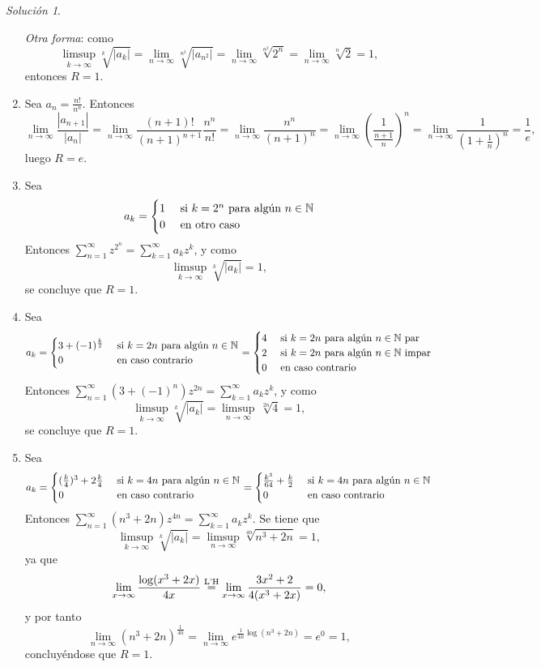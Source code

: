\documentclass[11pt]{report}
\newcommand{\N}{\mathbb N}
\newcommand{\serie}[2][0]{\sum_{n=#1}^\infty #2}
\theoremstyle{remark}
\newtheorem*{resolution}{Solución}
\begin{document}
\begin{resolution}
\begin{enumerate}
    \textit{Otra forma}: como
    \[\limsup_{k \to \infty} \sqrt[k]{|a_k|} = \lim_{n \to \infty} \sqrt[n^2]{|a_{n^2}|} = \lim_{n \to \infty} \sqrt[n^2]{2^n} = \lim_{n \to \infty} \sqrt[n]{2} = 1,\]
    entonces $R = 1$.
    \item Sea $a_n = \frac{n!}{n^n}$. Entonces
    \[\lim_{n \to \infty} \frac{|a_{n+1}|}{|a_n|} = \lim_{n \to \infty} \frac{(n+1)!}{(n+1)^{n+1}}\frac{n^n}{n!} = \lim_{n \to \infty} \frac{n^n}{(n+1)^n} =  \lim_{n \to \infty} \left(\frac{1}{\frac{n+1}{n}}\right)^n = \lim_{n \to \infty} \frac{1}{(1+\frac{1}{n})^n} = \frac{1}{e},\]
    luego $ R= e$.
    \item Sea
    \[a_k = \begin{cases}
        1 & $ si $ k = 2^n $ para algún $ n \in \N \\
        0 & $ en otro caso$
    \end{cases}\]
    Entonces $\serie[1]{z^{2^n}} = \sum_{k=1}^\infty a_kz^k$, y como
    \[\limsup_{k \to \infty} \sqrt[k]{|a_k|} = 1,\]
    se concluye que $R = 1$.
    \item Sea
    \[a_k = \begin{cases}
        3+(-1)^{\frac{k}{2}} & $ si $ k = 2n $ para algún $ n \in \N \\
        0 & $ en caso contrario $
    \end{cases} = \begin{cases}
        4 & $ si $ k = 2n $ para algún $ n \in \N $ par$ \\
        2 & $ si $ k = 2n $ para algún $ n \in \N $ impar$ \\
        0 & $ en caso contrario $
    \end{cases} \]
    Entonces $\serie[1]{(3+(-1)^n)z^{2n}} = \sum_{k=1}^\infty a_kz^k$, y como
    \[\limsup_{k \to \infty} \sqrt[k]{|a_k|} = \limsup_{n \to \infty} \, \sqrt[2n]{4} = 1,\]
    se concluye que $R = 1$.
    \item Sea
    \[a_k = \begin{cases}
        (\frac{k}{4})^3+2\frac{k}{4} & $ si $ k = 4n $ para algún $ n \in \N \\
        0 & $ en caso contrario $
    \end{cases} =\begin{cases}
        \frac{k^3}{64}+\frac{k}{2} & $ si $ k = 4n $ para algún $ n \in \N \\
        0 & $ en caso contrario $
    \end{cases} \]
    Entonces $\serie[1]{(n^3+2n)z^{4n}} = \sum_{k=1}^\infty a_kz^k$. Se tiene que
    \[\limsup_{k \to \infty} \sqrt[k]{|a_k|} = \limsup_{n \to \infty} \sqrt[4n]{n^3+2n} = 1,\]
    ya que
    \[\lim_{x \to \infty}\frac{\log(x^3+2x)}{4x} \overset{\textup{L'H}}{=} \lim_{x \to \infty} \frac{3x^2+2}{4(x^3+2x)} = 0,\]
    y por tanto
    \[\lim_{n \to \infty}\left(n^3+2n\right)^{\frac{1}{4n}} = \lim_{n \to \infty} e^{\frac{1}{4n}\log(n^3+2n)} = e^0 = 1,\]
    concluyéndose que $R = 1$.
\end{enumerate}
\end{resolution}
\end{document}
